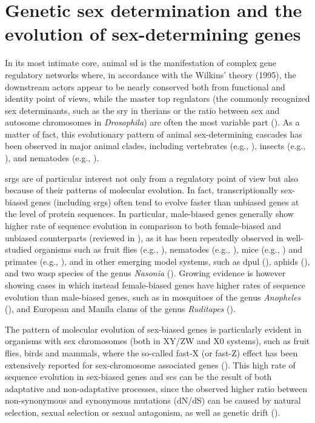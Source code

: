 \section{Genetic sex determination and the evolution of sex-determining genes}

In its most intimate core, animal \gls{sd} is the manifestation of complex gene regulatory networks where, in accordance with the Wilkins’ theory (1995), the downstream actors appear to be nearly conserved both from functional and identity point of views, while the master top regulators (the commonly recognized sex determinants, such as the \gls{sry} in therians or the ratio between sex and autosome chromosomes in \textit{Drosophila}) are often the most variable part (\textbf{\cite{beukeboom2014evolution}}). As a matter of fact, this evolutionary pattern of animal sex-determining cascades has been observed in major animal clades, including vertebrates (e.g., \textbf{\cite{marshall2010homologies}}), insects (e.g., \textbf{\cite{verhulst2010insect}}), and nematodes (e.g., \textbf{\cite{stothard2003sex}}).

\Glspl{srg} are of particular interest not only from a regulatory point of view but also because of their patterns of molecular evolution. In fact, transcriptionally sex-biased genes (including \glspl{srg}) often tend to evolve faster than unbiased genes at the level of protein sequences. In particular, male-biased genes generally show higher rate of sequence evolution in comparison to both female-biased and unbiased counterparts (reviewed in \textbf{\cite{parsch2013evolutionary,grath2016sex}}), as it has been repeatedly observed in well-studied organisms such as fruit flies (e.g., \textbf{\cite{meisel2013faster}}), nematodes (e.g., \textbf{\cite{cutter2005sexual}}), mice (e.g., \textbf{\cite{kousathanas2014faster}}) and primates (e.g., \textbf{\cite{khaitovich2005parallel}}), and in other emerging model systems, such as \gls{dpul} (\textbf{\cite{eads2007profiling}}), aphids (\textbf{\cite{purandare2014accelerated}}), and two wasp species of the genus \textit{Nasonia} (\textbf{\cite{wang2015nasonia}}). Growing evidence is however showing cases in which instead female-biased genes have higher rates of sequence evolution than male-biased genes, such as in mosquitoes of the genus \textit{Anopheles} (\textbf{\cite{papa2017anopheles}}), and European and Manila clams of the genus \textit{Ruditapes} (\textbf{\cite{ghiselli2018comparative}}).

The pattern of molecular evolution of sex-biased genes is particularly evident in organisms with sex chromosomes (both in XY/ZW and X0 systems), such as fruit flies, birds and mammals, where the so-called fast-X (or fast-Z) effect has been extensively reported for sex-chromosome associated genes (\textbf{\cite{vicoso2006evolutionXchrom,meisel2013faster,mank2007fastZ}}). This high rate of sequence evolution in sex-biased genes and \glspl{sc} can be the result of both adaptative and non-adaptative processes, since the observed higher ratio between non-synonymous and synonymous mutations (dN/dS) can be caused by natural selection, sexual selection or sexual antagonism, as well as genetic drift (\textbf{\cite{vicoso2006evolutionXchrom,parsch2013evolutionary,meisel2013faster,grath2016sex}}).

